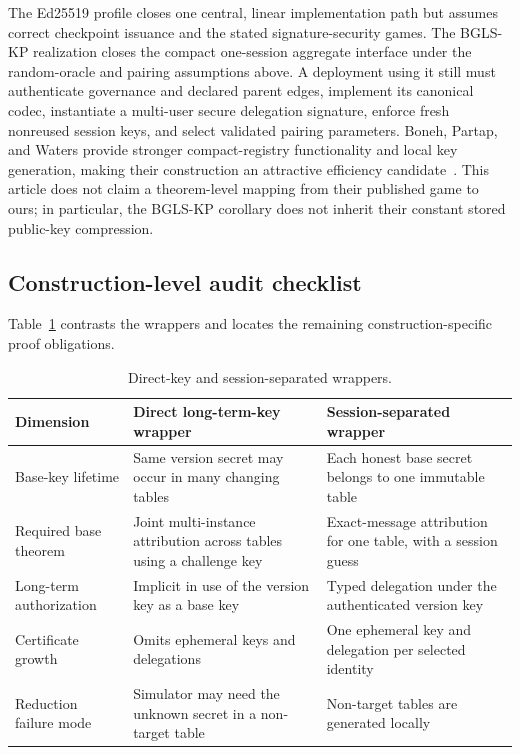 \documentclass[11pt]{article}
\theoremstyle{definition}
\begin{document}
The Ed25519 profile closes one central, linear implementation path but assumes correct checkpoint issuance and the stated signature-security games.  The BGLS-KP realization closes the compact one-session aggregate interface under the random-oracle and pairing assumptions above.  A deployment using it still must authenticate governance and declared parent edges, implement its canonical codec, instantiate a multi-user secure delegation signature, enforce fresh nonreused session keys, and select validated pairing parameters.  Boneh, Partap, and Waters provide stronger compact-registry functionality and local key generation, making their construction an attractive efficiency candidate~\cite{boneh2025accountable}.  This article does not claim a theorem-level mapping from their published game to ours; in particular, the BGLS-KP corollary does not inherit their constant stored public-key compression.

\subsection{Construction-level audit checklist}\label{subsec:audit-checklist}
Table~\ref{tab:audit} contrasts the wrappers and locates the remaining construction-specific proof obligations.

\begin{table}[t]
\centering
\caption{Direct-key and session-separated wrappers.}
\label{tab:audit}
\begin{tabularx}{\linewidth}{@{}>{\raggedright\arraybackslash}p{.21\linewidth}>{\raggedright\arraybackslash}X>{\raggedright\arraybackslash}X@{}}
\toprule
Dimension & Direct long-term-key wrapper & Session-separated wrapper\\
\midrule
Base-key lifetime & Same version secret may occur in many changing tables & Each honest base secret belongs to one immutable table\\
Required base theorem & Joint multi-instance attribution across tables using a challenge key & Exact-message attribution for one table, with a session guess\\
Long-term authorization & Implicit in use of the version key as a base key & Typed delegation under the authenticated version key\\
Certificate growth & Omits ephemeral keys and delegations & One ephemeral key and delegation per selected identity\\
Reduction failure mode & Simulator may need the unknown secret in a non-target table & Non-target tables are generated locally\\
\bottomrule
\end{tabularx}
\end{table}
\end{document}
